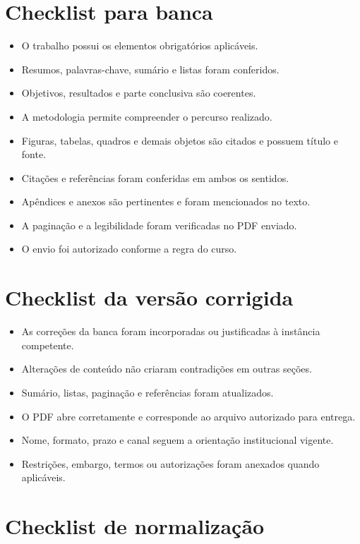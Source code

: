 \section{Checklist para banca}

\begin{itemize}
  \item O trabalho possui os elementos obrigatórios aplicáveis.
  \item Resumos, palavras-chave, sumário e listas foram conferidos.
  \item Objetivos, resultados e parte conclusiva são coerentes.
  \item A metodologia permite compreender o percurso realizado.
  \item Figuras, tabelas, quadros e demais objetos são citados e possuem título e fonte.
  \item Citações e referências foram conferidas em ambos os sentidos.
  \item Apêndices e anexos são pertinentes e foram mencionados no texto.
  \item A paginação e a legibilidade foram verificadas no PDF enviado.
  \item O envio foi autorizado conforme a regra do curso.
\end{itemize}

\section{Checklist da versão corrigida}

\begin{itemize}
  \item As correções da banca foram incorporadas ou justificadas à instância competente.
  \item Alterações de conteúdo não criaram contradições em outras seções.
  \item Sumário, listas, paginação e referências foram atualizados.
  \item O PDF abre corretamente e corresponde ao arquivo autorizado para entrega.
  \item Nome, formato, prazo e canal seguem a orientação institucional vigente.
  \item Restrições, embargo, termos ou autorizações foram anexados quando aplicáveis.
\end{itemize}

\section{Checklist de normalização}

